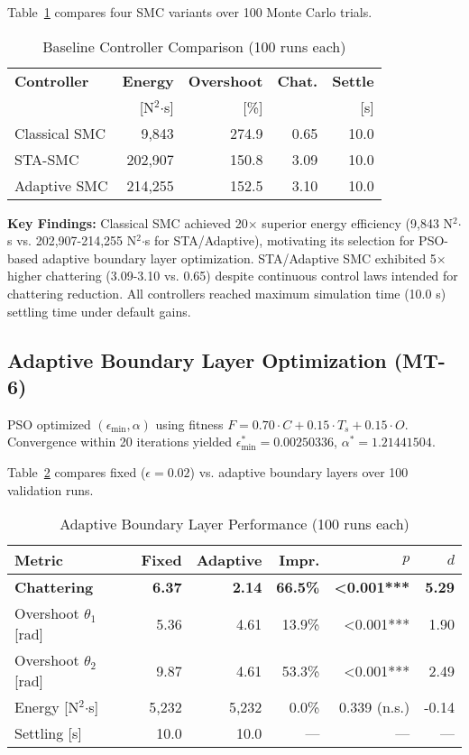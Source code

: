 \documentclass[conference]{IEEEtran}
\begin{document}
Table~\ref{tab:baseline} compares four SMC variants over 100 Monte Carlo trials.

\begin{table}[!t]
\caption{Baseline Controller Comparison (100 runs each)}
\label{tab:baseline}
\centering
\small
\begin{tabular}{@{}lrrrr@{}}
\toprule
\textbf{Controller} & \textbf{Energy} & \textbf{Overshoot} & \textbf{Chat.} & \textbf{Settle} \\
 & [N$^2$$\cdot$s] & [\%] &  & [s] \\
\midrule
Classical SMC & 9,843 & 274.9 & 0.65 & 10.0 \\
STA-SMC & 202,907 & 150.8 & 3.09 & 10.0 \\
Adaptive SMC & 214,255 & 152.5 & 3.10 & 10.0 \\
\bottomrule
\end{tabular}
\end{table}

\textbf{Key Findings:} Classical SMC achieved 20$\times$ superior energy efficiency (9,843 N$^2$$\cdot$s vs. 202,907-214,255 N$^2$$\cdot$s for STA/Adaptive), motivating its selection for PSO-based adaptive boundary layer optimization. STA/Adaptive SMC exhibited 5$\times$ higher chattering (3.09-3.10 vs. 0.65) despite continuous control laws intended for chattering reduction. All controllers reached maximum simulation time (10.0 s) settling time under default gains.

\subsection{Adaptive Boundary Layer Optimization (MT-6)}

PSO optimized $(\epsilon_{\min}, \alpha)$ using fitness $F = 0.70 \cdot C + 0.15 \cdot T_s + 0.15 \cdot O$. Convergence within 20 iterations yielded $\epsilon_{\min}^* = 0.00250336$, $\alpha^* = 1.21441504$.

Table~\ref{tab:mt6} compares fixed ($\epsilon = 0.02$) vs. adaptive boundary layers over 100 validation runs.

\begin{table}[!t]
\caption{Adaptive Boundary Layer Performance (100 runs each)}
\label{tab:mt6}
\centering
\small
\begin{tabular}{@{}lrrrrr@{}}
\toprule
\textbf{Metric} & \textbf{Fixed} & \textbf{Adaptive} & \textbf{Impr.} & \textbf{$p$} & \textbf{$d$} \\
\midrule
\textbf{Chattering} & \textbf{6.37} & \textbf{2.14} & \textbf{66.5\%} & \textbf{<0.001***} & \textbf{5.29} \\
Overshoot $\theta_1$ [rad] & 5.36 & 4.61 & 13.9\% & <0.001*** & 1.90 \\
Overshoot $\theta_2$ [rad] & 9.87 & 4.61 & 53.3\% & <0.001*** & 2.49 \\
Energy [N$^2$$\cdot$s] & 5,232 & 5,232 & 0.0\% & 0.339 (n.s.) & -0.14 \\
Settling [s] & 10.0 & 10.0 & — & — & — \\
\bottomrule
\end{tabular}
\end{table}
\end{document}
